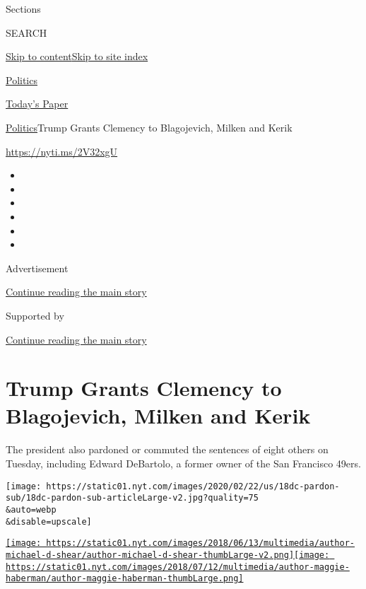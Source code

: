 Sections

SEARCH

\protect\hyperlink{site-content}{Skip to
content}\protect\hyperlink{site-index}{Skip to site index}

\href{https://www.nytimes.com/section/politics}{Politics}

\href{https://myaccount.nytimes.com/auth/login?response_type=cookie\&client_id=vi}{}

\href{https://www.nytimes.com/section/todayspaper}{Today's Paper}

\href{/section/politics}{Politics}\textbar{}Trump Grants Clemency to
Blagojevich, Milken and Kerik

\url{https://nyti.ms/2V32xgU}

\begin{itemize}
\item
\item
\item
\item
\item
\item
\end{itemize}

Advertisement

\protect\hyperlink{after-top}{Continue reading the main story}

Supported by

\protect\hyperlink{after-sponsor}{Continue reading the main story}

\hypertarget{trump-grants-clemency-to-blagojevich-milken-and-kerik}{%
\section{Trump Grants Clemency to Blagojevich, Milken and
Kerik}\label{trump-grants-clemency-to-blagojevich-milken-and-kerik}}

The president also pardoned or commuted the sentences of eight others on
Tuesday, including Edward DeBartolo, a former owner of the San Francisco
49ers.

\texttt{[image: https://static01.nyt.com/images/2020/02/22/us/18dc-pardon-sub/18dc-pardon-sub-articleLarge-v2.jpg?quality=75\\\&auto=webp\\\&disable=upscale]}

\href{https://www.nytimes.com/by/michael-d-shear}{\texttt{[image: https://static01.nyt.com/images/2018/06/13/multimedia/author-michael-d-shear/author-michael-d-shear-thumbLarge-v2.png]}}\href{https://www.nytimes.com/by/maggie-haberman}{\texttt{[image: https://static01.nyt.com/images/2018/07/12/multimedia/author-maggie-haberman/author-maggie-haberman-thumbLarge.png]}}


